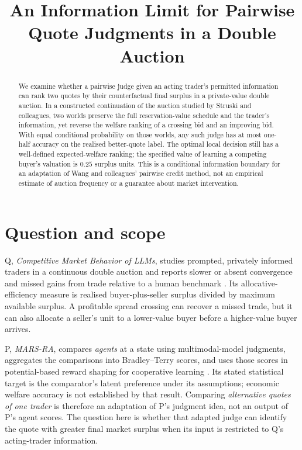 \documentclass{article}
\title{An Information Limit for Pairwise Quote Judgments in a Double Auction}
\begin{document}
\maketitle

\begin{abstract}
We examine whether a pairwise judge given an acting trader's permitted information can rank two quotes by
their counterfactual final surplus in a private-value double auction. In a constructed continuation of the
auction studied by Struski and colleagues, two worlds preserve the full reservation-value schedule and the
trader's information, yet reverse the welfare ranking of a crossing bid and an improving bid. With equal
conditional probability on those worlds, any such judge has at most one-half accuracy on the realised
better-quote label. The optimal local decision still has a well-defined expected-welfare ranking; the
specified value of learning a competing buyer's valuation is \(0.25\) surplus units. This is a conditional
information boundary for an adaptation of Wang and colleagues' pairwise credit method, not an empirical
estimate of auction frequency or a guarantee about market intervention.
\end{abstract}

\section{Question and scope}

Q, \emph{Competitive Market Behavior of LLMs}, studies prompted, privately informed traders in a continuous
double auction and reports slower or absent convergence and missed gains from trade relative to a human
benchmark \cite{struski2026competitive}. Its allocative-efficiency measure is realised buyer-plus-seller
surplus divided by maximum available surplus. A profitable spread crossing can recover a missed trade, but it
can also allocate a seller's unit to a lower-value buyer before a higher-value buyer arrives.

P, \emph{MARS-RA}, compares \emph{agents} at a state using multimodal-model judgments, aggregates the
comparisons into Bradley--Terry scores, and uses those scores in potential-based reward shaping for
cooperative learning \cite{wang2026marsra}. Its stated statistical target is the comparator's latent
preference under its assumptions; economic welfare accuracy is not established by that result. Comparing
\emph{alternative quotes of one trader} is therefore an adaptation of P's judgment idea, not an output of P's
agent scores. The question here is whether that adapted judge can identify the quote with greater final market
surplus when its input is restricted to Q's acting-trader information.
\end{document}
